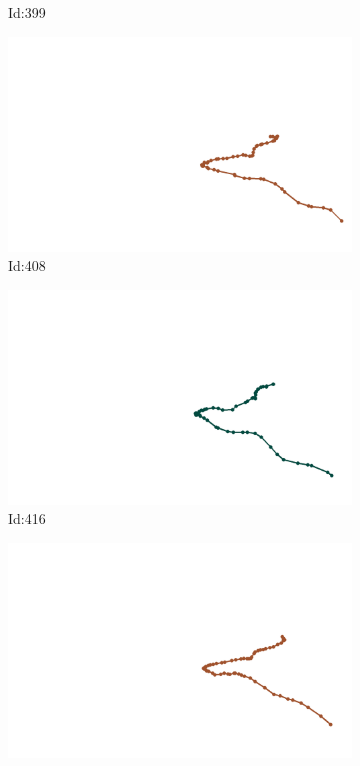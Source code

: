 \documentclass[12pt,twoside]{report}
\begin{document}
\begin{figure}
\begin{subfigure}[b]{0.20\textwidth}
\caption{Id:399}
\end{subfigure}
\begin{subfigure}[b]{0.20\textwidth}
\centering
\includegraphics[width=\textwidth]{../trajectories/408.png}
\caption{Id:408}
\end{subfigure}
\begin{subfigure}[b]{0.20\textwidth}
\centering
\includegraphics[width=\textwidth]{../trajectories/416.png}
\caption{Id:416}
\end{subfigure}
\begin{subfigure}[b]{0.20\textwidth}
\centering
\includegraphics[width=\textwidth]{../trajectories/422.png}

\end{subfigure}
\end{figure}
\end{document}
